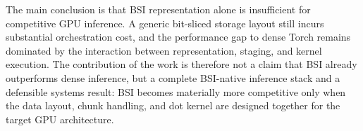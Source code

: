 The main conclusion is that BSI representation alone is insufficient for competitive GPU inference. A generic bit-sliced storage layout still incurs substantial orchestration cost, and the performance gap to dense Torch remains dominated by the interaction between representation, staging, and kernel execution. The contribution of the work is therefore not a claim that BSI already outperforms dense inference, but a complete BSI-native inference stack and a defensible systems result: BSI becomes materially more competitive only when the data layout, chunk handling, and dot kernel are designed together for the target GPU architecture.
